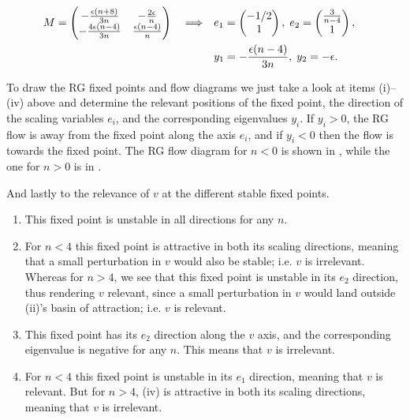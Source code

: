 \documentclass[11pt,letter, swedish, english
]{article}
\begin{document}
\begin{enumerate}[label=(\roman*)]
\[\begin{aligned}
M=
\begin{pmatrix}
-\frac{\epsilon(n+8)}{3n} & -\frac{2\epsilon}{n} \\
-\frac{4\epsilon(n-4)}{3n} & \frac{\epsilon(n-4)}{n}
\end{pmatrix}
\quad\Longrightarrow\quad &
e_1=\begin{pmatrix}
-1/2\\1
\end{pmatrix},\;
e_2=\begin{pmatrix}
\frac{3}{n-4}\\1
\end{pmatrix}\qcomma \\
&y_1=-\frac{\epsilon(n-4)}{3n},\;y_2=-\epsilon.
\end{aligned}
\]%
\end{enumerate}

To draw the RG fixed points and flow diagrams we just take a look at
items (i)--(iv) above and determine the relevant positions of the fixed
point, the direction of the scaling variables $e_i$, and the
corresponding eigenvalues $y_i$. If $y_i>0$, the RG flow is away from
the fixed point along the axis $e_i$, and if $y_i<0$ then the flow is
towards the fixed point. The RG flow diagram for $n<0$ is shown in
, while the one for $n>0$ is in .


And lastly to the relevance of $v$ at the different stable fixed
points. 
\begin{enumerate}[label=(\roman*)]
\item This fixed point is unstable in all directions for any $n$.
\item For $n<4$ this fixed point is attractive in both its scaling
directions, meaning that a small perturbation in $v$ would also be
stable; i.e. $v$ is irrelevant. Whereas for $n>4$, we see that this
fixed point is unstable in its $e_2$ direction, thus rendering $v$
relevant, since a small perturbation in $v$ would land outside (ii)'s
basin of attraction; i.e. $v$ is relevant.
\item This fixed point has its $e_2$ direction along the $v$ axis, and
the corresponding eigenvalue is negative for any $n$. This means that
$v$ is irrelevant.
\item For $n<4$ this fixed point is unstable in its $e_1$ direction,
meaning that $v$ is relevant. But for $n>4$, (iv) is attractive in
both its scaling directions, meaning that $v$ is irrelevant. 
\end{enumerate}
\end{document}
